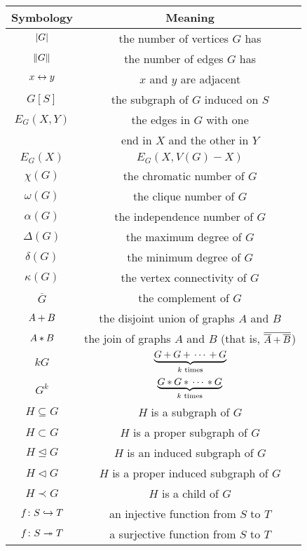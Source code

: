 \begin{center}
\setlength{\extrarowheight}{2.5pt}
  \begin{longtable}{c|c}
	 Symbology & Meaning \\
    \hline
    $\left|G\right|$ & the number of vertices $G$ has \\
    $\left\Vert G\right\Vert$ & the number of edges $G$ has \\
    $x \leftrightarrow y$ & $x$ and $y$ are adjacent \\
    $G[S]$ & the subgraph of $G$ induced on $S$ \\
    $E_G(X, Y)$ & the edges in $G$ with one \\
                & end in $X$ and the other in $Y$ \\
    $E_G(X)$ & $E_G(X, V(G) - X)$ \\
	 $\chi(G)$ & the chromatic number of $G$ \\
	 $\omega(G)$ & the clique number of $G$ \\
	 $\alpha(G)$ & the independence number of $G$ \\
	 $\Delta(G)$ & the maximum degree of $G$ \\
	 $\delta(G)$ & the minimum degree of $G$ \\
    $\kappa(G)$ & the vertex connectivity of $G$ \\
    $\overline{G}$ & the complement of $G$ \\
	 $A \mbox{\hspace{2 pt}$+$\hspace{2 pt}} B$ & the disjoint union of graphs $A$ and $B$ \\
	 $A \mbox{\hspace{2 pt}$\ast$\hspace{2 pt}} B$ & the join of graphs $A$ and $B$ (that is,  $\overline{\overline{A} \mbox{\hspace{2 pt}$+$\hspace{2 pt}} \overline{B}}$) \\
    $kG$ & $\underbrace{G \mbox{\hspace{2 pt}$+$\hspace{2 pt}} G \mbox{\hspace{2 pt}$+$\hspace{2 pt}} \cdots \mbox{\hspace{2 pt}$+$\hspace{2 pt}} G}_{\text{$k$ times}}$ \\
    $G^k$ & $\underbrace{G \mbox{\hspace{2 pt}$\ast$\hspace{2 pt}} G \mbox{\hspace{2 pt}$\ast$\hspace{2 pt}} \cdots \mbox{\hspace{2 pt}$\ast$\hspace{2 pt}} G}_{\text{$k$ times}}$ \\
	 $H \subseteq G$ & $H$ is a subgraph of $G$ \\
	 $H \subset G$ & $H$ is a proper subgraph of $G$ \\
    $H \unlhd G$ & $H$ is an induced subgraph of $G$ \\
    $H \lhd G$ & $H$ is a proper induced subgraph of $G$ \\
    $H \prec G$ & $H$ is a child of $G$ \\
    $f\colon S \hookrightarrow T$ & an injective function from $S$ to $T$ \\
    $f\colon S \twoheadrightarrow T$ & a surjective function from $S$ to $T$ \\

\end{longtable}
\end{center}
